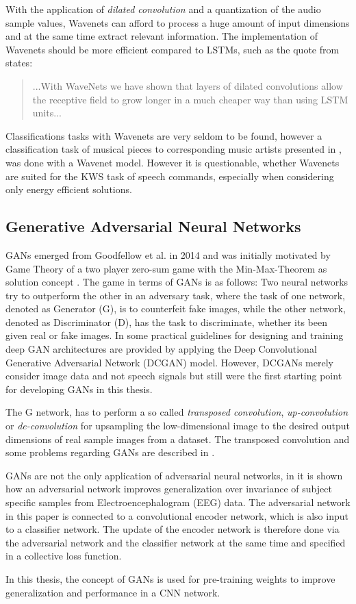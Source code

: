 With the application of \emph{dilated convolution} and a quantization of the audio sample values, Wavenets can afford to process a huge amount of input dimensions and at the same time extract relevant information.
The implementation of Wavenets should be more efficient compared to LSTMs, such as the quote from \cite{Oord2016} states:
\begin{quote}
  ...With WaveNets we have shown that layers of dilated convolutions allow the receptive field to grow longer in a much cheaper way than using LSTM units...
\end{quote}
Classifications tasks with Wavenets are very seldom to be found, however a classification task of musical pieces to corresponding music artists presented in \cite{Zhang2020}, was done with a Wavenet model.
However it is questionable, whether Wavenets are suited for the KWS task of speech commands, especially when considering only energy efficient solutions.



\subsection{Generative Adversarial Neural Networks}\label{sec:prev_nn_adv}
GANs emerged from Goodfellow et al. in 2014 \cite{Goodfellow2014} and was initially motivated by Game Theory of a two player zero-sum game with the Min-Max-Theorem as solution concept \cite{VonNeumann1944}.
The game in terms of GANs is as follows: Two neural networks try to outperform the other in an adversary task, where the task of one network, denoted as Generator (G), is to counterfeit fake images, while the other network, denoted as Discriminator (D), has the task to discriminate, whether its been given real or fake images.
In \cite{Radford2016} some practical guidelines for designing and training deep GAN architectures are provided by applying the Deep Convolutional Generative Adversarial Network (DCGAN) model.
However, DCGANs merely consider image data and not speech signals but still were the first starting point for developing GANs in this thesis.

The G network, has to perform a so called \emph{transposed convolution}, \emph{up-convolution} or \emph{de-convolution} for upsampling the low-dimensional image to the desired output dimensions of real sample images from a dataset.
The transposed convolution and some problems regarding GANs are described in \cite{Durall2020}.

GANs are not the only application of adversarial neural networks, in \cite{Oezdenizci2020} it is shown how an adversarial network improves generalization over invariance of subject specific samples from Electroencephalogram (EEG) data.
The adversarial network in this paper is connected to a convolutional encoder network, which is also input to a classifier network.
The update of the encoder network is therefore done via the adversarial network and the classifier network at the same time and specified in a collective loss function.

In this thesis, the concept of GANs is used for pre-training weights to improve generalization and performance in a CNN network.